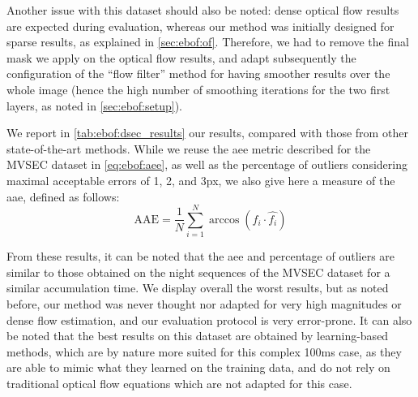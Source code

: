 Another issue with this dataset should also be noted: dense optical flow results are expected during evaluation, whereas our method was initially designed for sparse results, as explained in \cref{sec:ebof:of}. Therefore, we had to remove the final mask we apply on the optical flow results, and adapt subsequently the configuration of the ``flow filter'' method for having smoother results over the whole image (hence the high number of smoothing iterations for the two first layers, as noted in \cref{sec:ebof:setup}).

We report in \cref{tab:ebof:dsec_results} our results, compared with those from other state-of-the-art methods. While we reuse the \acrshort{aee} metric described for the MVSEC dataset in \cref{eq:ebof:aee}, as well as the percentage of outliers considering maximal acceptable errors of 1, 2, and 3px, we also give here a measure of the \acrfull{aae}, defined as follows:
\begin{equation}
  \text{AAE} = \frac{1}{N}\sum_{i=1}^{N}\arccos(f_i \cdot \hat{f_i})
\end{equation}

From these results, it can be noted that the \acrshort{aee} and percentage of outliers are similar to those obtained on the night sequences of the MVSEC dataset for a similar accumulation time. We display overall the worst results, but as noted before, our method was never thought nor adapted for very high magnitudes or dense flow estimation, and our evaluation protocol is very error-prone. It can also be noted that the best results on this dataset are obtained by learning-based methods, which are by nature more suited for this complex 100ms case, as they are able to mimic what they learned on the training data, and do not rely on traditional optical flow equations which are not adapted for this case.

